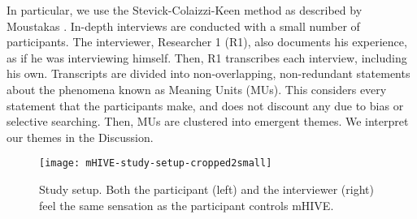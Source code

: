 In particular, we use the Stevick-Colaizzi-Keen method as described by Moustakas \cite{Moustakas1994}.
In-depth interviews are conducted with a small number of participants.
The interviewer, Researcher 1 (R1), also documents his experience, as if he was interviewing himself.
Then, R1 transcribes each interview, including his own.
Transcripts are divided into non-overlapping, non-redundant statements about the phenomena known as Meaning Units (MUs).
This considers every statement that the participants make, and does not discount any due to bias or selective searching.
%
Then, MUs are clustered into emergent themes. %
%
We interpret our themes in the Discussion.


\begin{figure}[Htb]
	\centering
	   \texttt{[image: mHIVE-study-setup-cropped2small]} 
	   \caption{
	   Study setup. Both the participant (left) and the interviewer (right) feel the same sensation as the participant controls mHIVE.
}
	   \label{fig:hapticinstrument:StudySetup}
\end{figure}

